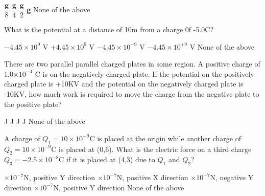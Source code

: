 \documentclass[13pt,addpoints]{exam}
\begin{document}
{{{\begin{questions}
					\begin{oneparchoices}
						\choice $\dfrac{\textbf{g}}{8}$
						\choice $\dfrac{\textbf{g}}{4}$
						\choice $\dfrac{\textbf{g}}{2}$
						\choice \textbf{g}
						\choice None of the above
					\end{oneparchoices}
					\question What is the potential at a distance of 10m from a charge 0f -5.0C?\\
					\begin{oneparchoices}
						\choice $-4.45\times10^{9}$ V
						\choice $+4.45\times10^{9}$ V
						\choice $-4.45\times10^{-9}$ V
						\choice $-4.45\times10^{+9}$ V
						\choice None of the above
					\end{oneparchoices}
					\question There are two parallel parallel charged plates in some region. A positive charge of 1.0$\times10^{-4}$ C is on the negatively charged plate. If the potential on the positively charged plate is +10KV and the potential on the negatively charged plate is -10KV, how much work is required to move the charge from the negative plate to the positive plate?\\
					\begin{oneparchoices}
						\choice 2.0 J
						\choice 0.0 J
						\choice 4.0 J
						\choice 1.0 J
						\choice None of the above
					\end{oneparchoices} 
					\question A charge of $Q_1=10\times10^{-9}$C is placed at the origin while another charge of $Q_2=10\times10^{-9}$C is placed at (0,6). What is the electric force on a third charge $Q_3=-2.5\times10^{-8}$C if it is placed at (4,3) due to $Q_1$ and $Q_2$?\\
					\begin{oneparchoices}
						$\times10^{-7}$N, positive Y direction 
						$\times10^{-7}$N, positive X direction
						$\times10^{-7}$N, negative Y direction
						$\times10^{-7}$N, positive Y direction
						\choice None of the above
					\end{oneparchoices}

\end{questions}}}}
\end{document}
